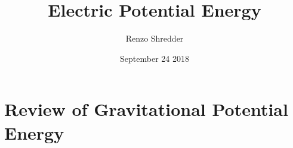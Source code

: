 \documentclass[a4paper]{article}
\title{Electric Potential Energy}
\author{Renzo Shredder}
\date{September 24 2018}
\begin{document}
\maketitle
\section*{Review of Gravitational Potential Energy}


 
\nocite{*}
\end{document}
